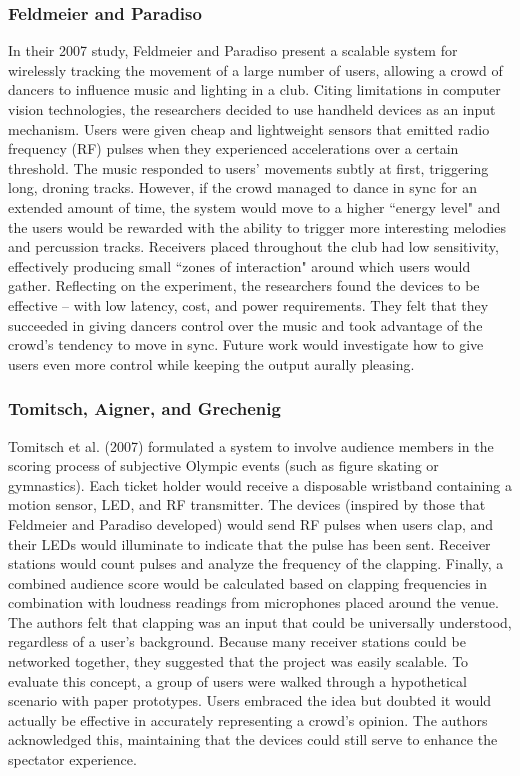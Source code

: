 \subsubsection{Feldmeier and Paradiso}

In their 2007 study, Feldmeier and Paradiso present a scalable system for wirelessly tracking the movement of a large number of users, allowing a crowd of dancers to influence music and lighting in a club. Citing limitations in computer vision technologies, the researchers decided to use handheld devices as an input mechanism. Users were given cheap and lightweight sensors that emitted radio frequency (RF) pulses when they experienced accelerations over a certain threshold. The music responded to users' movements subtly at first, triggering long, droning tracks. However, if the crowd managed to dance in sync for an extended amount of time, the system would move to a higher ``energy level" and the users would be rewarded with the ability to trigger more interesting melodies and percussion tracks. Receivers placed throughout the club had low sensitivity, effectively producing small ``zones of interaction" around which users would gather. Reflecting on the experiment, the researchers found the devices to be effective -- with low latency, cost, and power requirements. They felt that they succeeded in giving dancers control over the music and took advantage of the crowd's tendency to move in sync. Future work would investigate how to give users even more control while keeping the output aurally pleasing.

\subsubsection{Tomitsch, Aigner, and Grechenig}

Tomitsch et al. (2007) formulated a system to involve audience members in the scoring process of subjective Olympic events (such as figure skating or gymnastics). Each ticket holder would receive a disposable wristband containing a motion sensor, LED, and RF transmitter. The devices (inspired by those that Feldmeier and Paradiso developed) would send RF pulses when users clap, and their LEDs would illuminate to indicate that the pulse has been sent. Receiver stations would count pulses and analyze the frequency of the clapping. Finally, a combined audience score would be calculated based on clapping frequencies in combination with loudness readings from microphones placed around the venue. The authors felt that clapping was an input that could be universally understood, regardless of a user's background. Because many receiver stations could be networked together, they suggested that the project was easily scalable. To evaluate this concept, a group of users were walked through a hypothetical scenario with paper prototypes. Users embraced the idea but doubted it would actually be effective in accurately representing a crowd's opinion. The authors acknowledged this, maintaining that the devices could still serve to enhance the spectator experience.

